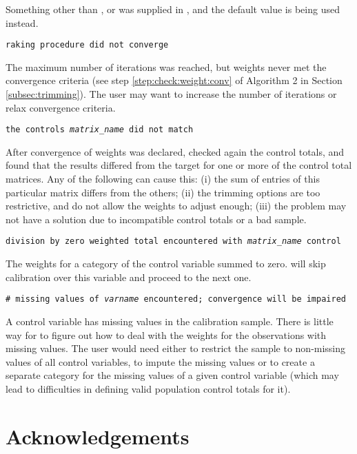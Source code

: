     \morehang
    Something other than ,  or  was supplied
    in , and the default value is being used instead.

    \noindent
    {\tt raking procedure did not converge}

    \morehang
    The maximum number of iterations was reached, but weights never met the convergence
    criteria (see step \ref{step:check:weight:conv} of Algorithm 2 in Section \ref{subsec:trimming}). 
    The user may want to increase the number of iterations or relax convergence criteria.

    \noindent
    {\tt the controls {\it matrix{\_}name} did not match}

    \morehang
    After convergence of weights was declared, 
    checked again the control totals, and found that the results
    differed from the target for one or more of the control total
    matrices. Any of the following can cause this: (i) the sum of
    entries of this particular matrix differs from the others;
    (ii) the trimming options are too restrictive, and do not allow
    the weights to adjust enough; (iii) the problem may not have a
    solution due to incompatible control totals or a bad sample.

    \noindent
    {\tt division by zero weighted total encountered with
    {\it matrix{\_}name} control}

    \morehang
    The weights for a category of the control variable summed 
    to zero.  will skip calibration over this
    variable and proceed to the next one.

    \noindent
    {\tt \# missing values of {\it varname} encountered; convergence will be impaired}

    \morehang
    A control variable has missing values in the calibration sample.
    There is little way for  to figure out how to deal
    with the weights for the observations with missing values. The user would need 
    either to restrict the sample to non-missing values of all control variables,
    to impute the missing values or to create a separate category for the missing
    values of a given control variable (which may lead to difficulties in defining
    valid population control totals for it).

\section*{Acknowledgements}

